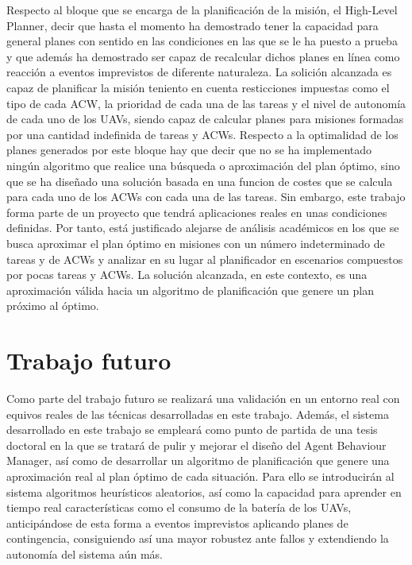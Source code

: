 \documentclass[fontsize=11pt, English=false, Español=true, Myfinal=true, twoside, numbers=noenddot]{scrbook}
\begin{document}
{Respecto al bloque que se encarga de la planificación de la misión, el High-Level Planner, decir que hasta el momento ha demostrado tener la capacidad para general planes con sentido en las condiciones en las que se le ha puesto a prueba y que además ha demostrado ser capaz de recalcular dichos planes en línea como reacción a eventos imprevistos de diferente naturaleza. La solición alcanzada es capaz de planificar la misión teniento en cuenta resticciones impuestas como el tipo de cada ACW, la prioridad de cada una de las tareas y el nivel de autonomía de cada uno de los UAVs, siendo capaz de calcular planes para misiones formadas por una cantidad indefinida de tareas y ACWs. Respecto a la optimalidad de los planes generados por este bloque hay que decir que no se ha implementado ningún algoritmo que realice una búsqueda o aproximación del plan óptimo, sino que se ha diseñado una solución basada en una funcion de costes que se calcula para cada uno de los ACWs con cada una de las tareas. Sin embargo, este trabajo forma parte de un proyecto que tendrá aplicaciones reales en unas condiciones definidas. Por tanto, está justificado alejarse de análisis académicos en los que se busca aproximar el plan óptimo en misiones con un número indeterminado de tareas y de ACWs y analizar en su lugar al planificador en escenarios compuestos por pocas tareas y ACWs. La solución alcanzada, en este contexto, es una aproximación válida hacia un algoritmo de planificación que genere un plan próximo al óptimo.

\section{Trabajo futuro}
\label{sec:FutureWork}
Como parte del trabajo futuro se realizará una validación en un entorno real con equivos reales de las técnicas desarrolladas en este trabajo. Además, el sistema desarrollado en este trabajo se empleará como punto de partida de una tesis doctoral en la que se tratará de pulir y mejorar el diseño del Agent Behaviour Manager, así como de desarrollar un algoritmo de planificación que genere una aproximación real al plan óptimo de cada situación. Para ello se introducirán al sistema algoritmos heurísticos aleatorios, así como la capacidad para aprender en tiempo real características como el consumo de la batería de los UAVs, anticipándose de esta forma a eventos imprevistos aplicando planes de contingencia, consiguiendo así una mayor robustez ante fallos y extendiendo la autonomía del sistema aún más.

}
\end{document}
